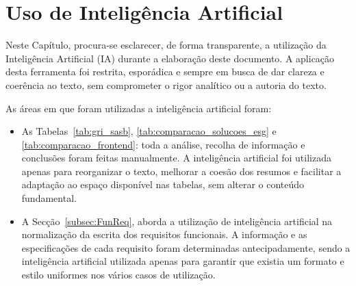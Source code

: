 \chapter{Uso de Inteligência Artificial}
\label{chap:AI}

Neste Capítulo, procura-se esclarecer, de forma transparente, a utilização da Inteligência Artificial (IA) durante a elaboração deste documento. A aplicação desta ferramenta foi restrita, esporádica e sempre em busca de dar clareza e coerência ao texto, sem comprometer o rigor analítico ou a autoria do texto.

As áreas em que foram utilizadas a inteligência artificial foram:

\begin{itemize}
  \item As Tabelas~\ref{tab:gri_sasb}, \ref{tab:comparacao_solucoes_esg} e \ref{tab:comparacao_frontend}: toda a análise, recolha de informação e conclusões foram feitas manualmente. A inteligência artificial foi utilizada apenas para reorganizar o texto, melhorar a coesão dos resumos e facilitar a adaptação ao espaço disponível nas tabelas, sem alterar o conteúdo fundamental.

  \item A Secção~\ref{subsec:FunReq}, aborda a utilização de inteligência artificial na normalização da escrita dos requisitos funcionais. A informação e as especificações de cada requisito foram determinadas antecipadamente, sendo a inteligência artificial utilizada apenas para garantir que existia um formato e estilo uniformes nos vários casos de utilização.
\end{itemize}
